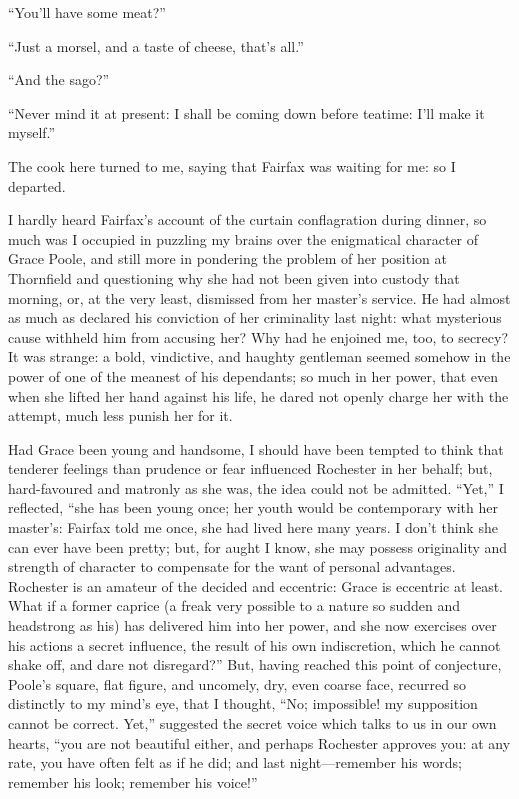 \enquote{You'll have some meat?}

\enquote{Just a morsel, and a taste of cheese, that's all.}

\enquote{And the sago?}

\enquote{Never mind it at present: I shall be coming down before
teatime: I'll make it myself.}

The cook here turned to me, saying that \Mrs{} Fairfax was waiting for me:
so I departed.

I hardly heard \Mrs{} Fairfax's account of the curtain conflagration
during dinner, so much was I occupied in puzzling my brains over the
enigmatical character of Grace Poole, and still more in pondering the
problem of her position at Thornfield and questioning why she had not
been given into custody that morning, or, at the very least, dismissed
from her master's service.  He had almost as much as declared his
conviction of her criminality last night: what mysterious cause withheld
him from accusing her?  Why had he enjoined me, too, to secrecy?  It was
strange: a bold, vindictive, and haughty gentleman seemed somehow in the
power of one of the meanest of his dependants; so much in her power,
that even when she lifted her hand against his life, he dared not openly
charge her with the attempt, much less punish her for it.

Had Grace been young and handsome, I should have been tempted to think
that tenderer feelings than prudence or fear influenced \Mr{} Rochester in
her behalf; but, hard-favoured and matronly as she was, the idea could
not be admitted.  \enquote{Yet,} I reflected, \enquote{she has been
young once; her youth would be contemporary with her master's: \Mrs{}
Fairfax told me once, she had lived here many years.  I don't think she
can ever have been pretty; but, for aught I know, she may possess
originality and strength of character to compensate for the want of
personal advantages.  \Mr{} Rochester is an amateur of the decided and
eccentric: Grace is eccentric at least.  What if a former caprice (a
freak very possible to a nature so sudden and headstrong as his) has
delivered him into her power, and she now exercises over his actions a
secret influence, the result of his own indiscretion, which he cannot
shake off, and dare not disregard?}  But, having reached this point of
conjecture, \Mrs{} Poole's square, flat figure, and uncomely, dry, even
coarse face, recurred so distinctly to my mind's eye, that I thought,
\enquote{No; impossible! my supposition cannot be correct.  Yet,}
suggested the secret voice which talks to us in our own hearts,
\enquote{you are not beautiful either, and perhaps \Mr{} Rochester
approves you: at any rate, you have often felt as if he did; and last
night---remember his words; remember his look; remember his voice!}

